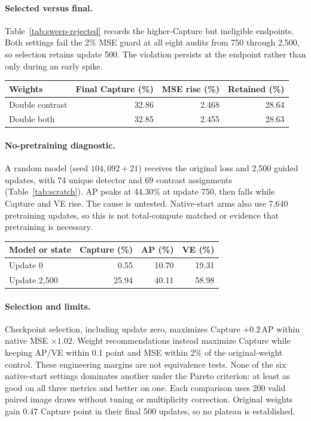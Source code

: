\paragraph{Selected versus final.}
Table~\ref{tab:sweep-rejected} records the higher-Capture but ineligible
endpoints. Both settings fail the 2\% MSE guard at all eight audits from
750 through 2,500, so selection retains update 500. The violation persists
at the endpoint rather than only during an early spike.
\begin{agfresulttable}
\caption{Rejected endpoints and retained update-500 Capture.}\label{tab:sweep-rejected}
\begin{tabular}{@{}lrrr@{}}
\toprule
Weights & Final Capture (\%) & MSE rise (\%) & Retained (\%) \\
\midrule
Double contrast & 32.86 & 2.468 & 28.64 \\
Double both & 32.85 & 2.455 & 28.63 \\
\bottomrule
\end{tabular}

\end{agfresulttable}

\paragraph{No-pretraining diagnostic.}
A random model (seed $104{,}092+21$) receives the original loss and
2,500 guided updates, with 74 unique detector and 69 contrast assignments
(Table~\ref{tab:scratch}). AP peaks at 44.30\% at update 750, then falls
while Capture and VE rise. The cause is untested. Native-start arms also
use 7,640 pretraining updates, so this is not total-compute matched or
evidence that pretraining is necessary.
\begin{agfresulttable}
\caption{Guided training from a random start.}\label{tab:scratch}
\begin{tabular}{@{}lrrr@{}}
\toprule
Model or state & Capture (\%) & AP (\%) & VE (\%) \\
\midrule
Update 0 & 0.55 & 10.70 & 19.31 \\
Update 2,500 & 25.94 & 40.11 & 58.98 \\
\bottomrule
\end{tabular}

\end{agfresulttable}

\paragraph{Selection and limits.}
Checkpoint selection, including update zero, maximizes Capture
$+0.2\,\mathrm{AP}$ within native MSE $\times1.02$. Weight recommendations
instead maximize Capture while keeping AP/VE within 0.1 point and MSE within
2\% of the original-weight control. These engineering margins are not
equivalence tests. None of the six native-start settings dominates another
under the Pareto criterion: at least as good on all three metrics and better
on one. Each comparison uses 200 valid paired image draws without tuning or
multiplicity correction. Original weights gain 0.47 Capture point in their
final 500 updates, so no plateau is established.

